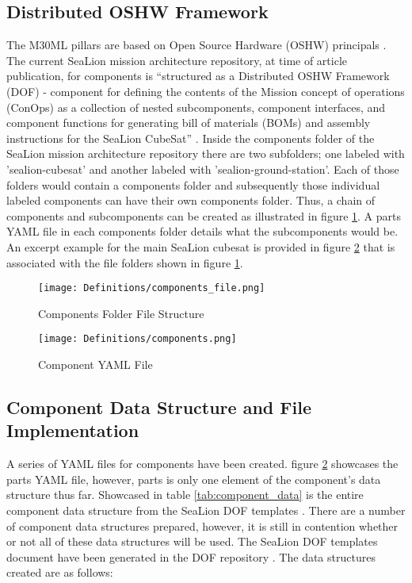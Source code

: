 \documentclass[journal,article,submit,pdftex,moreauthors]{Definitions/mdpi}
\begin{document}
\subsection{Distributed OSHW Framework}
The M30ML pillars are based on Open Source Hardware (OSHW) principals \cite{mach30_git}.  The current SeaLion mission architecture repository, at time of article publication, for components is “structured as a Distributed OSHW Framework (DOF) - component for defining the contents of the Mission concept of operations (ConOps) as a collection of nested subcomponents, component interfaces, and component functions for generating bill of materials (BOMs) and assembly instructions for the SeaLion CubeSat” \cite{sealion_mission_architecture}.  Inside the components folder of the SeaLion mission architecture repository there are two subfolders; one labeled with 'sealion-cubesat' and another labeled with 'sealion-ground-station'.  Each of those folders would contain a components folder and subsequently those individual labeled components can have their own components folder.  Thus, a chain of components and subcomponents can be created as illustrated in figure \ref{fig:components_file}.  A parts YAML file in each components folder details what the subcomponents would be.  An excerpt example for the main SeaLion cubesat is provided in figure \ref{fig:components} that is associated with the file folders shown in figure \ref{fig:components_file}.

\begin{figure}[H]
    \texttt{[image: Definitions/components\_file.png]}
    \caption{Components Folder File Structure}
	\label{fig:components_file}
    \end{figure}   
\unskip

\begin{figure}[H]
    \texttt{[image: Definitions/components.png]}
    \caption{Component YAML File}
	\label{fig:components}
    \end{figure}   
\unskip

\subsection{Component Data Structure and File Implementation}
A series of YAML files for components have been created.  figure \ref{fig:components} showcases the parts YAML file, however, parts is only one element of the component's data structure thus far.  Showcased in table \ref{tab:component_data} is the entire component data structure from the SeaLion DOF templates \cite{sealion_dof}.  There are a number of component data structures prepared, however, it is still in contention whether or not all of these data structures will be used.  The SeaLion DOF templates document have been generated in the DOF repository \cite{sealion_dof}.  The data structures created are as follows:
\end{document}
